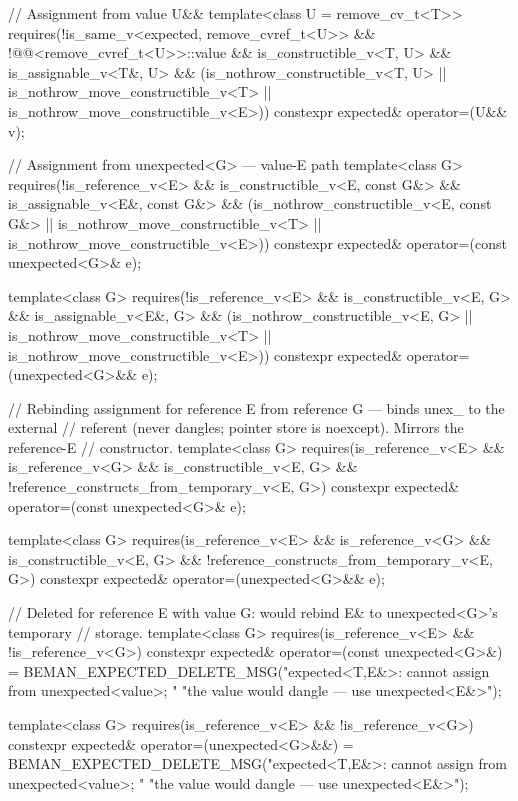 \begin{codeblock}
{{    // Assignment from value U&&
    template<class U = remove_cv_t<T>>
      requires(!is_same_v<expected, remove_cvref_t<U>> &&
               !@@<remove_cvref_t<U>>::value &&
               is_constructible_v<T, U> && is_assignable_v<T&, U> &&
               (is_nothrow_constructible_v<T, U> || is_nothrow_move_constructible_v<T> ||
                is_nothrow_move_constructible_v<E>))
    constexpr expected& operator=(U&& v);

    // Assignment from unexpected<G> — value-E path
    template<class G>
      requires(!is_reference_v<E> && is_constructible_v<E, const G&> &&
               is_assignable_v<E&, const G&> &&
               (is_nothrow_constructible_v<E, const G&> ||
                is_nothrow_move_constructible_v<T> || is_nothrow_move_constructible_v<E>))
    constexpr expected& operator=(const unexpected<G>& e);

    template<class G>
      requires(!is_reference_v<E> && is_constructible_v<E, G> && is_assignable_v<E&, G> &&
               (is_nothrow_constructible_v<E, G> || is_nothrow_move_constructible_v<T> ||
                is_nothrow_move_constructible_v<E>))
    constexpr expected& operator=(unexpected<G>&& e);

    // Rebinding assignment for reference E from reference G — binds unex_ to the external
    // referent (never dangles; pointer store is noexcept). Mirrors the reference-E
    // constructor.
    template<class G>
      requires(is_reference_v<E> && is_reference_v<G> && is_constructible_v<E, G> &&
               !reference_constructs_from_temporary_v<E, G>)
    constexpr expected& operator=(const unexpected<G>& e);

    template<class G>
      requires(is_reference_v<E> && is_reference_v<G> && is_constructible_v<E, G> &&
               !reference_constructs_from_temporary_v<E, G>)
    constexpr expected& operator=(unexpected<G>&& e);

    // Deleted for reference E with value G: would rebind E& to unexpected<G>'s temporary
    // storage.
    template<class G>
      requires(is_reference_v<E> && !is_reference_v<G>)
    constexpr expected& operator=(const unexpected<G>&) =
        BEMAN_EXPECTED_DELETE_MSG("expected<T,E&>: cannot assign from unexpected<value>; "
                                  "the value would dangle — use unexpected<E&>");

    template<class G>
      requires(is_reference_v<E> && !is_reference_v<G>)
    constexpr expected& operator=(unexpected<G>&&) =
        BEMAN_EXPECTED_DELETE_MSG("expected<T,E&>: cannot assign from unexpected<value>; "
                                  "the value would dangle — use unexpected<E&>");

}}
\end{codeblock}
